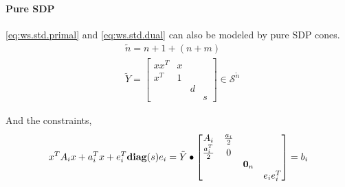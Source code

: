 \documentclass[../main]{subfiles}
\begin{document}
\paragraph{Pure SDP}
\eqref{eq:ws.std.primal} and \eqref{eq:ws.std.dual} can also be modeled by pure SDP cones.
\begin{equation}
    \begin{aligned}
         & \tilde n = n + 1 + (n + m)                                       \\
         & \tilde{Y} = \begin{bmatrix}
            xx^T & x &   &   \\
            x^T  & 1 &   &   \\
                 &   & d &   \\
                 &   &   & s
        \end{bmatrix}\in \mathscr S^{\tilde{n}}
    \end{aligned}
\end{equation}

And the constraints,
\begin{equation}
    x^TA_ix + a_i^Tx + e_i^T\mathbf{diag}(s)e_i = \tilde{Y} \bullet    \begin{bmatrix}
        A_i             & \frac{a_i}{2} &         &          \\
        \frac{a_i^T}{2} & 0             &         &          \\
                        &               & \bm 0_n &          \\
                        &               &         & e_ie_i^T
    \end{bmatrix} = b_i
\end{equation}
\end{document}
